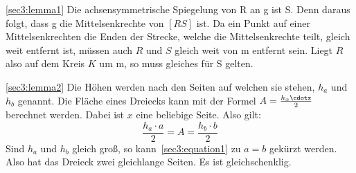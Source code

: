\documentclass[10pt, a4paper]{amsart}
\newenvironment{proof thm}[1]{
\begin{proof}[\proofname~(#1)]}{\end{proof}}
\begin{document}
\begin{proof thm}{\autoref{sec3:lemma1}}
  Die achsensymmetrische Spiegelung von R an g ist S. Denn daraus folgt, dass g
  die Mittelsenkrechte von $[RS]$ ist. Da ein Punkt auf einer Mittelsenkrechten
  die Enden der Strecke, welche die Mittelsenkrechte teilt, gleich weit entfernt
  ist, müssen auch $R$ und $S$ gleich weit von m entfernt sein. Liegt $R$ also
  auf dem Kreis $K$ um m, so muss gleiches für S gelten.
\end{proof thm}
\begin{proof thm}{\autoref{sec3:lemma2}}
  Die Höhen werden nach den Seiten auf welchen sie stehen, $h_a$ und $h_b$
  genannt. Die Fläche eines Dreiecks kann mit der Formel $A=\frac{h_x\cdotx}{2}$
  berechnet werden. Dabei ist $x$ eine beliebige Seite. Also gilt:
  \begin{equation}\label{sec3:equation1}
    \dfrac{h_a\cdot a}{2}=A=\dfrac{h_b\cdot b}{2}
  \end{equation}
  Sind $h_a$ und $h_b$ gleich groß, so kann~\eqref{sec3:equation1} zu $a=b$
  gekürzt werden. Also hat das Dreieck zwei gleichlange Seiten. Es ist
  gleichschenklig.
\end{proof thm}
\end{document}
